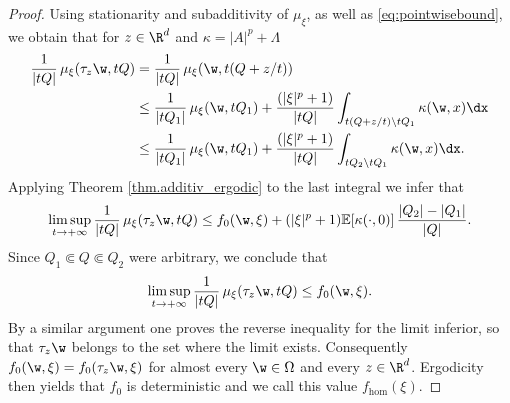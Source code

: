 \begin{proof}
Using stationarity and subadditivity of $\mu_{\xi}$, as well as \eqref{eq:pointwisebound}, we obtain that for $z\in\R^d$ and $\kappa=|A|^p+\Lambda$
\begin{align*}
\frac{1}{|tQ|}\,\mu_{\xi}(\tau_z\w,tQ)&=\frac{1}{|tQ|}\,\mu_{\xi}(\w,t(Q+z/t))
\\
&\leq \frac{1}{|tQ_1|}\,\mu_{\xi}(\w,tQ_1)+\frac{(|\xi|^p+1)}{|tQ|}\int_{t(Q+z/t)\setminus tQ_1}\kappa(\w,x)\dx
\\
&\leq \frac{1}{|tQ_1|}\,\mu_{\xi}(\w,tQ_1)+\frac{(|\xi|^p+1)}{|tQ|}\int_{tQ_2\setminus tQ_1}\kappa(\w,x)\dx.
\end{align*}
Applying Theorem \ref{thm.additiv_ergodic} to the last integral we infer that
\begin{equation*}
\limsup_{t\to +\infty}\frac{1}{|tQ|}\,\mu_{\xi}(\tau_z\w,tQ)\leq f_{0}(\w,\xi)+(|\xi|^p+1)\mathbb{E}[\kappa(\cdot,0)]\,\frac{|Q_2|-|Q_1|}{|Q|}.
\end{equation*}
Since $Q_1\Subset Q\Subset Q_2$ were arbitrary, we conclude that
\begin{equation*}
\limsup_{t\to +\infty}\frac{1}{|tQ|}\,\mu_{\xi}(\tau_z\w,tQ)\leq f_{0}(\w,\xi).
\end{equation*}
By a similar argument one proves the reverse inequality for the limit inferior, so that $\tau_z\w$ belongs to the set where the limit exists. Consequently $f_0(\w,\xi)=f_0(\tau_z\w,\xi)$ for almost every $\w\in\Omega$ and every $z\in\R^d$. Ergodicity then yields that $f_0$ is deterministic and we call this value $f_{\hom}(\xi)$.


\end{proof}
